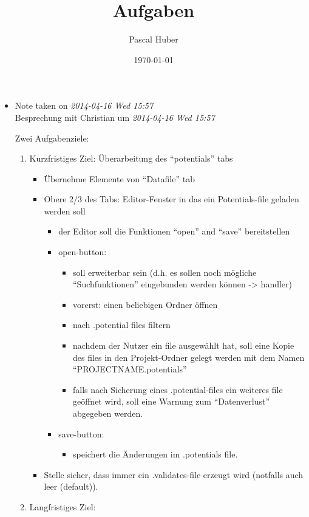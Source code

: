 \documentclass[11pt]{article}
\title{Aufgaben}
\author{Pascal Huber}
\date{\today}
\begin{document}
\maketitle

\setcounter{tocdepth}{3}
\tableofcontents
\vspace*{1cm}
\begin{itemize}
\item Note taken on \textit{2014-04-16 Wed 15:57} \\
Besprechung mit Christian um \textit{2014-04-16 Wed 15:57}
    
    Zwei Aufgabenziele:
\begin{enumerate}
\item Kurzfristiges Ziel:
       Überarbeitung des ``potentials'' tabs
\begin{itemize}
\item Übernehme Elemente von ``Datafile'' tab
\item Obere 2/3 des Tabs: Editor-Fenster in das ein Potentials-file geladen werden soll
\begin{itemize}
\item der Editor soll die Funktionen ``open'' and ``save'' bereitstellen
\item open-button:
\begin{itemize}
\item soll erweiterbar sein (d.h. es sollen noch mögliche ``Suchfunktionen'' eingebunden werden können -> handler)
\item vorerst: einen beliebigen Ordner öffnen
\item nach .potential files filtern
\item nachdem der Nutzer ein file ausgewählt hat, soll eine Kopie des files in den Projekt-Ordner gelegt werden mit dem Namen ``PROJECTNAME.potentials''
\item falls nach Sicherung eines .potential-files ein weiteres file geöffnet wird, soll eine Warnung zum ``Datenverlust'' abgegeben werden.
\end{itemize}
\item save-button:
\begin{itemize}
\item speichert die Änderungen im .potentials file.
\end{itemize}
\end{itemize}
\item Stelle sicher, dass immer ein .validates-file erzeugt wird (notfalls auch leer (default)).
\end{itemize}
\item Langfristiges Ziel:

\end{enumerate}
\end{itemize}
\end{document}
